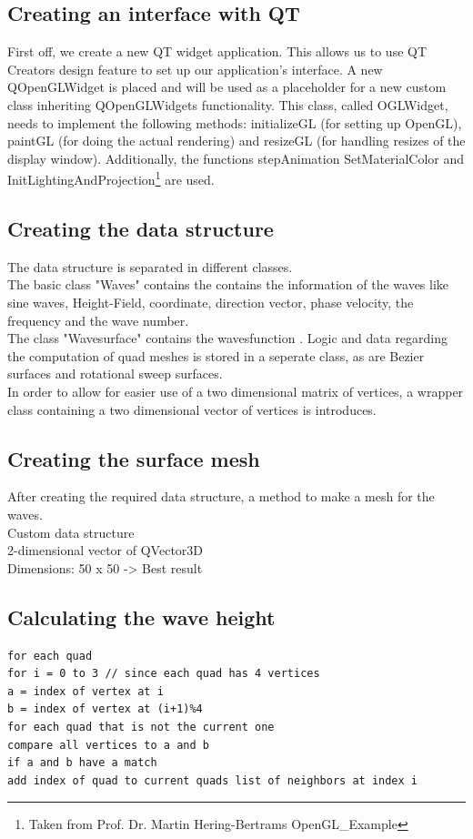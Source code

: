 \documentclass[12pt,a4paper]{scrartcl}
\begin{document}
\subsection{Creating an interface with QT}
First off, we create a new QT widget application. This allows us to use QT Creators design feature to set up our application's interface. A new QOpenGLWidget is placed and will be used as a placeholder for a new custom class inheriting QOpenGLWidgets functionality. This class, called OGLWidget, needs to implement the following methods: initializeGL (for setting up OpenGL), paintGL (for doing the actual rendering) and resizeGL (for handling resizes of the display window). Additionally, the functions stepAnimation SetMaterialColor and InitLightingAndProjection\footnote{Taken from Prof. Dr. Martin Hering-Bertrams OpenGL_Example} are used.

\subsection{Creating the data structure}
The data structure is separated in different classes. \\
The basic class "Waves" contains the contains the information of the waves like sine waves, Height-Field, coordinate, direction vector, phase velocity, the frequency and the wave number.  \\ 
The class "Wavesurface" contains the wavesfunction . 
Logic and data regarding the computation of quad meshes is stored in a seperate class, as are Bezier surfaces and rotational sweep surfaces. \\
In order to allow for easier use of a two dimensional matrix of vertices, a wrapper class containing a two dimensional vector of vertices is introduces. \\


\subsection{Creating the surface mesh}
After creating the required data structure, a method to make a mesh for the waves.\\
Custom data structure\\
2-dimensional vector of QVector3D\\
Dimensions: 50 x 50 -> Best result\\

\subsection{Calculating the wave height}
\begin{lstlisting}[language=PSEUDO]
for each quad
for i = 0 to 3 // since each quad has 4 vertices
a = index of vertex at i
b = index of vertex at (i+1)%4
for each quad that is not the current one
compare all vertices to a and b
if a and b have a match
add index of quad to current quads list of neighbors at index i 
\end{lstlisting}
\end{document}

